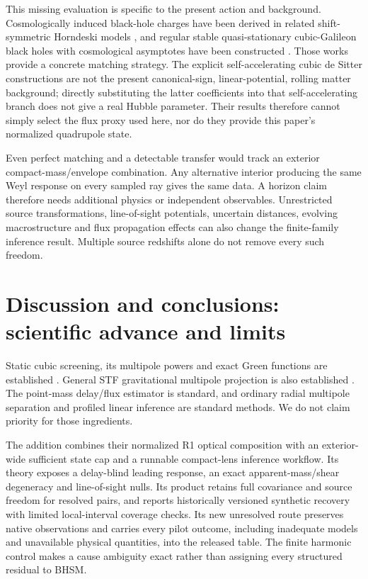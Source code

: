 \documentclass[11pt,a4paper]{article}
\begin{document}
This missing evaluation is specific to the present action and background.
Cosmologically induced black-hole charges have been derived in related
shift-symmetric Horndeski models \cite{Babichev2025}, and regular stable
quasi-stationary cubic-Galileon black holes with cosmological asymptotes
have been constructed \cite{Smulders2026}. Those works provide a concrete
matching strategy. The explicit self-accelerating cubic de Sitter
constructions are not the present canonical-sign, linear-potential, rolling
matter background; directly substituting the latter coefficients into
that self-accelerating branch does not give a real Hubble parameter.
Their results therefore cannot simply select the flux proxy used here,
nor do they provide this paper's normalized quadrupole state.

Even perfect matching and a detectable transfer would track an exterior
compact-mass/envelope combination. Any alternative interior producing
the same Weyl response on every sampled ray gives the same data. A
horizon claim therefore needs additional physics or independent
observables. Unrestricted source transformations, line-of-sight
potentials, uncertain distances, evolving macrostructure and flux
propagation effects can also change the finite-family inference result.
Multiple source redshifts alone do not remove every such freedom.

\section{Discussion and conclusions: scientific advance and limits}

Static cubic screening, its multipole powers and exact Green functions
are established \cite{Kimura2012,Chu2013,Brito2014,Kobayashi2026}.
General STF gravitational multipole projection is also established
\cite{Turyshev2022}. The point-mass delay/flux estimator is standard,
and ordinary radial multipole separation and profiled linear inference
are standard methods. We do not claim priority for those ingredients.

The addition combines their normalized R1 optical composition with an
exterior-wide sufficient state cap and a runnable compact-lens inference
workflow. Its theory exposes a delay-blind leading response, an exact
apparent-mass/shear degeneracy and line-of-sight nulls. Its product retains
full covariance and source freedom for resolved pairs, and reports
historically versioned synthetic recovery with limited local-interval
coverage checks. Its new unresolved route preserves native observations
and carries every pilot outcome, including inadequate models and
unavailable physical quantities, into the released table. The finite harmonic control makes a cause ambiguity exact
rather than assigning every structured residual to BHSM.
\end{document}
